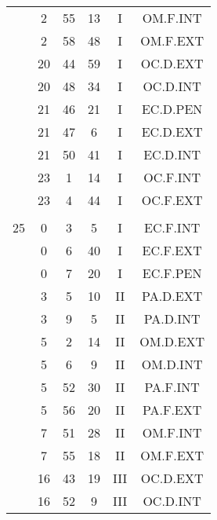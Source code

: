 \documentclass[12pt, a4paper]{article}
\begin{document}
\begin{multicols}{3}
{\begin{tabular}{c c c c c c}
	 	 	 	 & 2 & 55 & 13 & I & OM.F.INT\\%
	 	 	 	 & 2 & 58 & 48 & I & OM.F.EXT\\%
	 	 	 	 & 20 & 44 & 59 & I & OC.D.EXT\\%
	 	 	 	 & 20 & 48 & 34 & I & OC.D.INT\\%
	 	 	 	 & 21 & 46 & 21 & I & EC.D.PEN\\%
	 	 	 	 & 21 & 47 & 6 & I & EC.D.EXT\\%
	 	 	 	 & 21 & 50 & 41 & I & EC.D.INT\\%
	 	 	 	 & 23 & 1 & 14 & I & OC.F.INT\\%
	 	 	 	 & 23 & 4 & 44 & I & OC.F.EXT\\%
	 	 	 	 & & & & & \\%
	 	 	 	25 & 0 & 3 & 5 & I & EC.F.INT\\%
	 	 	 	 & 0 & 6 & 40 & I & EC.F.EXT\\%
	 	 	 	 & 0 & 7 & 20 & I & EC.F.PEN\\%
	 	 	 	 & 3 & 5 & 10 & II & PA.D.EXT\\%
	 	 	 	 & 3 & 9 & 5 & II & PA.D.INT\\%
	 	 	 	 & 5 & 2 & 14 & II & OM.D.EXT\\%
	 	 	 	 & 5 & 6 & 9 & II & OM.D.INT\\%
	 	 	 	 & 5 & 52 & 30 & II & PA.F.INT\\%
	 	 	 	 & 5 & 56 & 20 & II & PA.F.EXT\\%
	 	 	 	 & 7 & 51 & 28 & II & OM.F.INT\\%
	 	 	 	 & 7 & 55 & 18 & II & OM.F.EXT\\%
	 	 	 	 & 16 & 43 & 19 & III & OC.D.EXT\\%
	 	 	 	 & 16 & 52 & 9 & III & OC.D.INT\\%

\end{tabular}}
\end{multicols}
\end{document}
